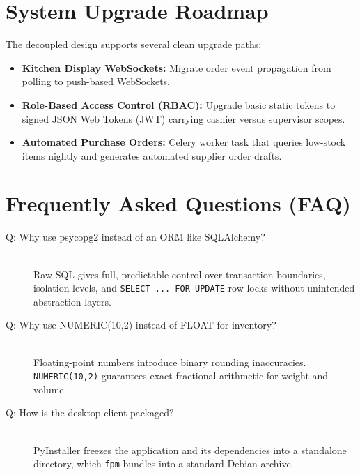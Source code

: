 \documentclass[11pt,a4paper]{article}
\begin{document}
\section{System Upgrade Roadmap}
The decoupled design supports several clean upgrade paths:
\begin{itemize}
    \item \textbf{Kitchen Display WebSockets:} Migrate order event propagation from polling to push-based WebSockets.
    \item \textbf{Role-Based Access Control (RBAC):} Upgrade basic static tokens to signed JSON Web Tokens (JWT) carrying cashier versus supervisor scopes.
    \item \textbf{Automated Purchase Orders:} Celery worker task that queries low-stock items nightly and generates automated supplier order drafts.
\end{itemize}

\section{Frequently Asked Questions (FAQ)}
\begin{description}
    \item[\color{thgablue}Q: Why use psycopg2 instead of an ORM like SQLAlchemy?]~\\
    Raw SQL gives full, predictable control over transaction boundaries, isolation levels, and \texttt{SELECT ... FOR UPDATE} row locks without unintended abstraction layers.
    \item[\color{thgablue}Q: Why use NUMERIC(10,2) instead of FLOAT for inventory?]~\\
    Floating-point numbers introduce binary rounding inaccuracies. \texttt{NUMERIC(10,2)} guarantees exact fractional arithmetic for weight and volume.
    \item[\color{thgablue}Q: How is the desktop client packaged?]~\\
    PyInstaller freezes the application and its dependencies into a standalone directory, which \texttt{fpm} bundles into a standard Debian archive.
\end{description}
\end{document}
